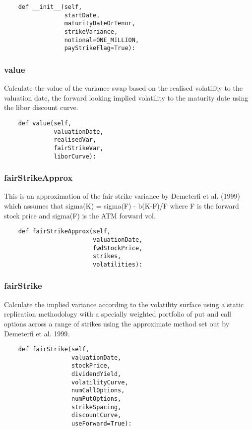 \documentclass[twoside,11pt]{book}
\begin{document}
\begin{lstlisting}
    def __init__(self,
                 startDate,
                 maturityDateOrTenor,
                 strikeVariance,
                 notional=ONE_MILLION,
                 payStrikeFlag=True):
\end{lstlisting}

\subsubsection*{{\bf value}}
Calculate the value of the variance swap based on the realised volatility to the valuation date, the forward looking implied volatility to the maturity date using the libor discount curve.  

\begin{lstlisting}
    def value(self, 
              valuationDate, 
              realisedVar, 
              fairStrikeVar, 
              liborCurve):
\end{lstlisting}

\subsubsection*{{\bf fairStrikeApprox}}
This is an approximation of the fair strike variance by Demeterfi et al. (1999) which assumes that sigma(K) = sigma(F) - b(K-F)/F where F is the forward stock price and sigma(F) is the ATM forward vol.  

\begin{lstlisting}
    def fairStrikeApprox(self,
                         valuationDate,
                         fwdStockPrice,
                         strikes,
                         volatilities):
\end{lstlisting}

\subsubsection*{{\bf fairStrike}}
Calculate the implied variance according to the volatility surface using a static replication methodology with a specially weighted portfolio of put and call options across a range of strikes using the approximate method set out by Demeterfi et al. 1999.  

\begin{lstlisting}
    def fairStrike(self,
                   valuationDate,
                   stockPrice,
                   dividendYield,
                   volatilityCurve,
                   numCallOptions,
                   numPutOptions,
                   strikeSpacing,
                   discountCurve,
                   useForward=True):
\end{lstlisting}
\end{document}
